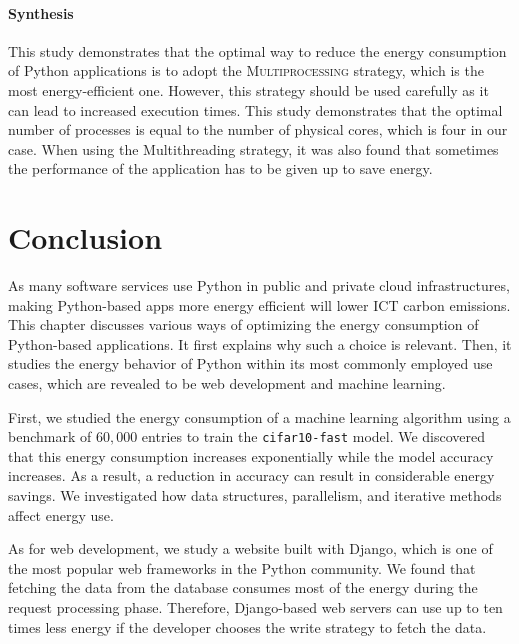 \paragraph*{Synthesis}
This study demonstrates that the optimal way to reduce the energy consumption of Python applications is to adopt the \textsc{Multiprocessing} strategy, which is the most energy-efficient one.
However, this strategy should be used carefully as it can lead to increased execution times.
This study demonstrates that the optimal number of processes is equal to the number of physical cores, which is four in our case.
When using the \textsf{Multithreading} strategy, it was also found that sometimes the performance of the application has to be given up to save energy.

\clearpage

\clearpage
\section{Conclusion}
As many software services use Python in public and private cloud infrastructures, making Python-based apps more energy efficient will lower ICT carbon emissions.
This chapter discusses various ways of optimizing the energy consumption of Python-based applications.
It first explains why such a choice is relevant.
Then, it studies the energy behavior of Python within its most commonly employed use cases, which are revealed to be web development and machine learning.


First, we studied the energy consumption of a machine learning algorithm using a benchmark of $60,000$ entries to train the \texttt{cifar10-fast} model.
We discovered that this energy consumption increases exponentially while the model accuracy increases.
As a result, a reduction in accuracy can result in considerable energy savings.
We investigated how data structures, parallelism, and iterative methods affect energy use.

As for web development, we study a website built with Django, which is one of the most popular web frameworks in the Python community.
We found that fetching the data from the database consumes most of the energy during the request processing phase.
Therefore, Django-based web servers can use up to ten times less energy if the developer chooses the write strategy to fetch the data.


